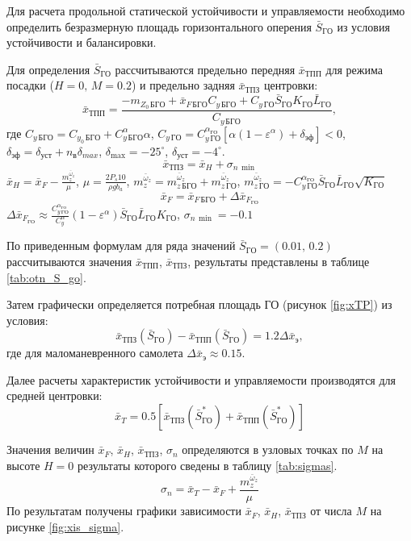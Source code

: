 Для расчета продольной статической устойчивости и управляемости
необходимо определить безразмерную площадь горизонтального оперения
$\bar{S}_{ГО}$ из условия устойчивости и
балансировки.

Для определения $\bar{S}_{ГО}$ рассчитываются
предельно передняя $\bar{x}_{ТПП}$ для режима
посадки ($H=0,\, M=0.2$) и предельно задняя
$\bar{x}_{ТПЗ}$ центровки:
\begin{equation}
    \bar{x}_{ТПП} = \frac{-m_{Z_0\, БГО} + \bar{x}_{F\, БГО}C_{y\, БГО}+ 
    C_{y\, ГО} \bar{S}_{ГО} K_{ГО} \bar{L}_{ГО}}{C_{y\, БГО}},
\end{equation}
где $C_{y \, БГО} = C_{y_0\,{БГО}} + C_{y\, БГО}^\alpha \alpha$, 
$C_{y\, ГО} = C_{y\, ГО}^{\alpha_{ГО}} \left[ \alpha(1-\varepsilon^\alpha) + 
\delta_{эф}\right] < 0$, $\delta_{эф} = \delta_{уст} + n_в \delta_{max}$,
$\delta_{\max} = -25^\circ$, $\delta_{уст} = -4^\circ$. 
\begin{equation}
    \bar{x}_{ТПЗ} = \bar{x}_{H} + \sigma_{n\, \min}
\end{equation}
$\bar{x}_{H} = \bar{x}_F - \frac{m_z^{\bar{\omega}_z}}{\mu}$, $\mu = \frac{2 P_s 10 }{\rho g b_a}$,
$m_z^{\bar{\omega}_z} = m_{z\, БГО}^{\bar{\omega}_z}+m_{z\, ГО}^{\bar{\omega}_z}$,
$m_{z\, ГО}^{\bar{\omega}_z} = - C_{y\, {ГО}}^{\alpha_{ГО}} \bar{S}_{ГО} \bar{L}_{ГО}
\sqrt{K_{ГО}}$
\begin{equation}
    \bar{x}_F = \bar{x}_{F\, БГО} + \Delta \bar{x}_{F_{ГО}}
\end{equation}
$ \Delta \bar{x}_{F_{ГО}} \approx \frac{C_{y\, ГО}^{\alpha_{ГО}} }{C_{y}^\alpha}
(1-\varepsilon^\alpha)\bar{S}_{ГО} \bar{L}_{ГО}
K_{ГО}$, $\sigma_{n\, \min} = -0.1$

По приведенным формулам для ряда значений
$\bar{S}_{ГО} = (0.01,\, 0.2)$ рассчитываются значения $\bar{x}_{ТПП}$,
$\bar{x}_{ТПЗ}$, результаты представлены в таблице \ref{tab:otn_S_go}. 

Затем графически  определяется потребная площадь ГО (рисунок \ref{fig:xTP}) из условия:
\[
    \bar{x}_{ТПЗ}(\bar{S}_{ГО}) - \bar{x}_{ТПП}(\bar{S}_{ГО}) = 1.2 \Delta \bar{x}_{э},
\]
где для маломаневренного самолета $\Delta \bar{x}_{э} \approx 0.15$.

Далее расчеты характеристик устойчивости и управляемости производятся
для средней центровки: 
\[
    \bar{x}_{T} = 0.5 \left[  \bar{x}_{ТПЗ}(\bar{S}_{ГО}^*) + \bar{x}_{ТПП}(\bar{S}_{ГО}^*) \right] 
\]

Значения величин $\bar{x}_F$, $\bar{x}_H$, $\bar{x}_{ТПЗ}$, $\sigma_n$ определяются в
узловых точках по $M$ на высоте $H=0$ результаты которого сведены в таблицу
\ref{tab:sigmas}. 
\[
    \sigma_n = \bar{x}_{T} - \bar{x}_{F} + \frac{m_z^{\bar{\omega}_z}}{\mu}
\]
По результатам получены графики зависимости $\bar{x}_F$, $\bar{x}_H$,
$\bar{x}_{ТПЗ}$ от числа $M$ на рисунке \ref{fig:xis_sigma}.

